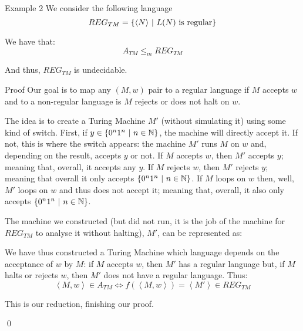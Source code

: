 \documentclass[a4paper]{article}
\begin{document}
\begin{parag}{Example 2}
    We consider the following language
    \[REG_{TM} = \left\{\left\langle N \right\rangle \suchthat L\left(N\right) \text{ is regular}\right\}\]

    We have that: 
    \[A_{TM} \leq_m REG_{TM}\]
    
    And thus, $REG_{TM}$ is undecidable.

    \begin{subparag}{Proof}
        Our goal is to map any $\left(M, w\right)$ pair to a regular language if $M$ accepts $w$ and to a non-regular language is $M$ rejects or does not halt on $w$.

        The idea is to create a Turing Machine $M'$ (without simulating it) using some kind of switch. First, if $y \in \left\{0^n 1^n \suchthat n \in \mathbb{N}\right\}$, the machine will directly accept it. If not, this is where the switch appears: the machine $M'$ runs $M$ on $w$ and, depending on the result, accepts $y$ or not. If $M$ accepts $w$, then $M'$ accepts $y$; meaning that, overall, it accepts any $y$. If $M$ rejects $w$, then $M'$ rejects $y$; meaning that overall it only accepts $\left\{0^n 1^n \suchthat n \in \mathbb{N}\right\}$. If $M$ loops on $w$ then, well, $M'$ loops on $w$ and thus does not accept it; meaning that, overall, it also only accepts $\left\{0^n 1^n \suchthat n \in \mathbb{N}\right\}$.

        The machine we constructed (but did not run, it is the job of the machine for $REG_{TM}$ to analyse it without halting), $M'$, can be represented as:

        We have thus constructed a Turing Machine which language depends on the acceptance of $w$ by $M$: if $M$ accepts $w$, then $M'$ has a regular language but, if $M$ halts or rejects $w$, then $M'$ does not have a regular language. Thus: 
        \[\left\langle M, w \right\rangle \in A_{TM} \iff f\left(\left\langle M, w \right\rangle\right) = \left\langle M' \right\rangle \in REG_{TM}\]
       
        This is our reduction, finishing our proof.

        \qed
    \end{subparag}
\end{parag}
\end{document}
